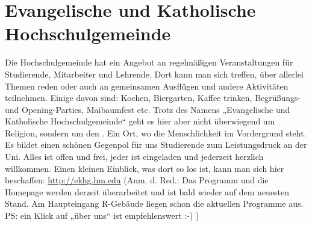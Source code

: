 \section{Evangelische und Katholische Hochschulgemeinde}
Die Hochschulgemeinde hat ein Angebot an regelmäßigen 
Veranstaltungen für Studierende, Mitarbeiter und Lehrende. Dort kann 
man sich treffen, über allerlei Themen reden oder auch an gemeinsamen
Ausflügen und andere Aktivitäten teilnehmen. Einige davon sind: 
Kochen, Biergarten, Kaffee trinken, Begrüßungs- und Opening-Parties, 
Maibaumfest etc. 
Trotz des Namens „Evangelische und Katholische Hochschulgemeinde“ 
geht es hier aber nicht überwiegend um Religion, sondern um den 
. Ein Ort, wo die Menschlichkeit im Vordergrund
steht. Es bildet einen schönen Gegenpol für uns Studierende zum 
Leistungsdruck an der Uni. 
Alles ist offen und frei, jeder ist eingeladen und jederzeit herzlich 
willkommen. 
Einen kleinen Einblick, was dort so los ist, kann man sich hier beschaffen: 
\url{http://ekhg.hm.edu} 
(Anm. d. Red.: Das Programm und die Homepage werden derzeit 
überarbeitet und ist bald wieder auf dem neuesten Stand.
Am Haupteingang R-Gebäude liegen schon die aktuellen Programme 
aus. PS: ein Klick auf „über uns“ ist empfehlenswert :-) ) 